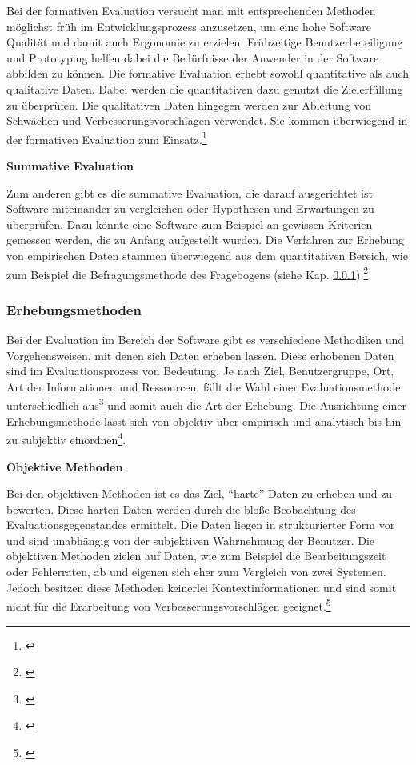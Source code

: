 Bei der formativen Evaluation versucht man mit entsprechenden Methoden möglichst früh im Entwicklungsprozess anzusetzen, um eine hohe Software Qualität und damit auch Ergonomie zu erzielen. Frühzeitige Benutzerbeteiligung und Prototyping helfen dabei die Bedürfnisse der Anwender in der Software abbilden zu können. Die formative Evaluation erhebt sowohl quantitative als auch qualitative Daten. Dabei werden die quantitativen dazu genutzt die Zielerfüllung zu überprüfen. Die qualitativen Daten hingegen werden zur Ableitung von Schwächen und Verbesserungsvorschlägen verwendet. Sie kommen überwiegend in der formativen Evaluation zum Einsatz.\footnote{\cite[vgl.][7]{Hegner2003}}

\textbf{Summative Evaluation}

Zum anderen gibt es die summative Evaluation, die darauf ausgerichtet ist Software miteinander zu vergleichen oder Hypothesen und Erwartungen zu überprüfen. Dazu könnte eine Software zum Beispiel an gewissen Kriterien gemessen werden, die zu Anfang aufgestellt wurden. Die Verfahren zur Erhebung von empirischen Daten stammen überwiegend aus dem quantitativen Bereich, wie zum Beispiel die Befragungsmethode des Fragebogens (siehe Kap. \ref{sec:erhebungsmethoden}).\footnote{\cite[vgl.][8]{Hegner2003}}


\subsubsection{Erhebungsmethoden}
\label{sec:erhebungsmethoden}
Bei der Evaluation im Bereich der Software gibt es verschiedene Methodiken und Vorgehensweisen, mit denen sich Daten erheben lassen. Diese erhobenen Daten sind im Evaluationsprozess von Bedeutung. Je nach Ziel, Benutzergruppe, Ort, Art der Informationen und Ressourcen, fällt die Wahl einer Evaluationsmethode unterschiedlich aus\footnote{\cite[vgl.][10]{Hegner2003}} und somit auch die Art der Erhebung. Die Ausrichtung einer Erhebungsmethode lässt sich von objektiv über empirisch und analytisch bis hin zu subjektiv einordnen\footnote{\cite[vgl.][15]{Hegner2003}}.

\textbf{Objektive Methoden}

Bei den objektiven Methoden ist es das Ziel, \enquote{harte} Daten zu erheben und zu bewerten. Diese harten Daten werden durch die bloße Beobachtung des Evaluationsgegenstandes ermittelt. Die Daten liegen in strukturierter Form vor und sind unabhängig von der subjektiven Wahrnehmung der Benutzer. Die objektiven Methoden zielen auf Daten, wie zum Beispiel die Bearbeitungszeit oder Fehlerraten, ab und eigenen sich eher zum Vergleich von zwei Systemen. Jedoch besitzen diese Methoden keinerlei Kontextinformationen und sind somit nicht für die Erarbeitung von Verbesserungsvorschlägen geeignet.\footnote{\cite[vgl.][17]{Hegner2003}}

